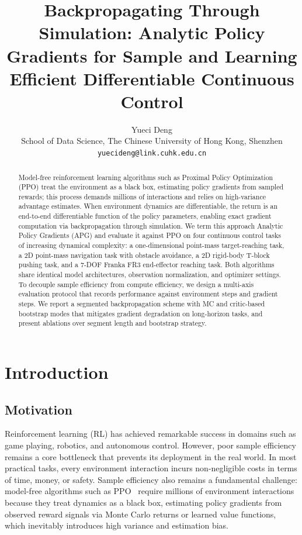 \documentclass[11pt,a4paper]{article}
\title{\textbf{Backpropagating Through Simulation: Analytic Policy Gradients for Sample and Learning Efficient Differentiable Continuous Control}}
\author{
  Yueci Deng\\
  School of Data Science, The Chinese University of Hong Kong, Shenzhen\\
  \texttt{yuecideng@link.cuhk.edu.cn}
}
\date{}
\begin{document}
\maketitle

\begin{abstract}
Model-free reinforcement learning algorithms such as Proximal Policy Optimization (PPO) treat the environment as a black box, estimating policy gradients from sampled rewards; this process demands millions of interactions and relies on high-variance advantage estimates. When environment dynamics are differentiable, the return is an end-to-end differentiable function of the policy parameters, enabling exact gradient computation via backpropagation through simulation. We term this approach Analytic Policy Gradients (APG) and evaluate it against PPO on four continuous control tasks of increasing dynamical complexity: a one-dimensional point-mass target-reaching task, a 2D point-mass navigation task with obstacle avoidance, a 2D rigid-body T-block pushing task, and a 7-DOF Franka FR3 end-effector reaching task. Both algorithms share identical model architectures, observation normalization, and optimizer settings. To decouple sample efficiency from compute efficiency, we design a multi-axis evaluation protocol that records performance against environment steps and gradient steps. We report a segmented backpropagation scheme with MC and critic-based bootstrap modes that mitigates gradient degradation on long-horizon tasks, and present ablations over segment length and bootstrap strategy.\end{abstract}

\section{Introduction}
\label{sec:introduction}

\subsection{Motivation}
\label{sec:motivation}
Reinforcement learning (RL) has achieved remarkable success in domains such as game playing, robotics, and autonomous control. However, poor sample efficiency remains a core bottleneck that prevents its deployment in the real world. In most practical tasks, every environment interaction incurs non-negligible costs in terms of time, money, or safety. Sample efficiency also remains a fundamental challenge: model-free algorithms such as PPO~\cite{schulman2017ppo} require millions of environment interactions because they treat dynamics as a black box, estimating policy gradients from observed reward signals via Monte Carlo returns or learned value functions, which inevitably introduces high variance and estimation bias.
\end{document}
